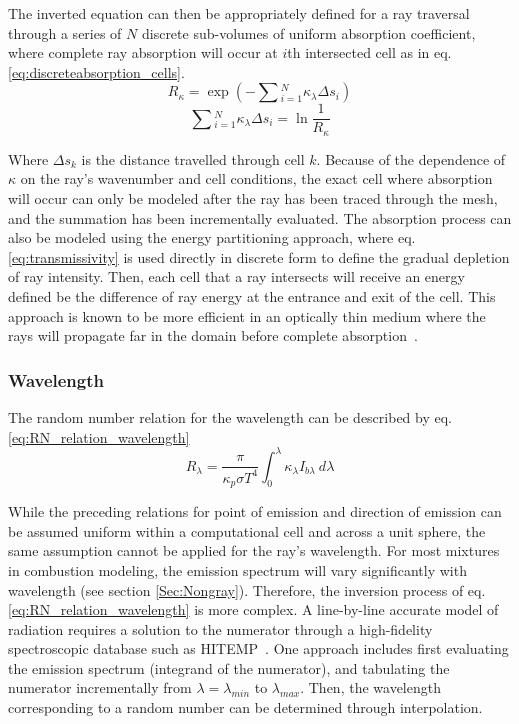 The inverted equation can then be appropriately defined for a ray traversal through a series of $N$ discrete sub-volumes of uniform absorption coefficient, where complete ray absorption will occur at $i$th intersected cell as in eq. \ref{eq:discreteabsorption_cells}.
\begin{equation}
    R_\kappa{}=\exp{\left(-\sum{}_{i=1}^N\kappa_\lambda{}\Delta{}s_i\right)}
\end{equation}
\begin{equation}
    \sum{}_{i=1}^N\kappa_\lambda{}\Delta{s_i}=\ln{\frac{1}{R_\kappa{}}}
    \label{eq:discreteabsorption_cells}
\end{equation}

Where $\Delta{s_k}$ is the distance travelled through cell $k$. Because of the dependence of $\kappa{}$ on the ray's wavenumber and cell conditions, the exact cell where absorption will occur can only be modeled after the ray has been traced through the mesh, and the summation has been incrementally evaluated.
The absorption process can also be modeled using the energy 
partitioning approach, where eq. \ref{eq:transmissivity} is used directly in discrete form to define the gradual depletion of ray intensity. 
Then, each cell that a ray intersects will receive an energy defined be the difference of ray energy at the entrance and exit of the cell.
This approach is known to be more efficient in an optically thin medium where the rays will propagate far in the domain before complete absorption~\cite{Modest2013RadiativeTransfer,Liu2020TheFlames}.

\subsubsection{Wavelength}
The random number relation for the wavelength can be described by eq. \ref{eq:RN_relation_wavelength}
\begin{equation}
    R_\lambda{}=\frac{\pi{}}{\kappa{}_p\sigma{}T^4}\int_0^\lambda{}\kappa{}_\lambda{}I_{b\lambda{}}~d\lambda{}
    \label{eq:RN_relation_wavelength}
\end{equation}

While the preceding relations for point of emission and direction of emission can be assumed uniform within a computational cell and across a unit sphere, the same assumption cannot be applied for the ray's wavelength. For most mixtures in combustion modeling, the emission spectrum will vary significantly with wavelength (see section \ref{Sec:Nongray}). 
Therefore, the inversion process of eq. \ref{eq:RN_relation_wavelength} is more complex.
A line-by-line accurate model of radiation requires a solution to the numerator through a high-fidelity spectroscopic database such as HITEMP~\cite{Rothman2010HITEMPDatabase}.
One approach includes first evaluating the emission spectrum (integrand of the numerator), and tabulating the numerator incrementally from $\lambda{}=\lambda{}_{min}$ to $\lambda{}_{max}$.
Then, the wavelength corresponding to a random number can be determined through interpolation.

